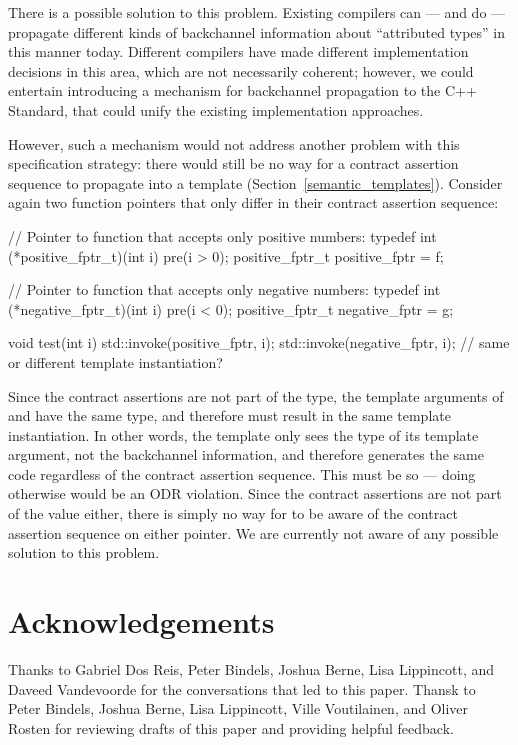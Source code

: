 There is a possible solution to this problem. Existing compilers can --- and do --- propagate different kinds of backchannel information about ``attributed types'' in this manner today. Different compilers have made different implementation decisions in this area, which are not necessarily coherent; however, we could entertain introducing a mechanism for backchannel propagation to the C++ Standard, that could unify the existing implementation approaches.

However, such a mechanism would not address another problem with this specification strategy: there would still be no way for a contract assertion sequence to propagate into a template (Section~\ref{semantic_templates}). Consider again two function pointers that only differ in their contract assertion sequence:
\begin{codeblock}
// Pointer to function that accepts only positive numbers:
typedef int (*positive_fptr_t)(int i) pre(i > 0);
positive_fptr_t positive_fptr = f;

// Pointer to function that accepts only negative numbers:
typedef int (*negative_fptr_t)(int i) pre(i < 0);
positive_fptr_t negative_fptr = g;

void test(int i) {
  std::invoke(positive_fptr, i);
  std::invoke(negative_fptr, i);  // same or different template instantiation?
}
\end{codeblock}
Since the contract assertions are not part of the type, the template arguments of  and  have the same type, and therefore must result in the same template instantiation. In other words, the template only sees the type of its template argument, not the backchannel information, and therefore generates the same code regardless of the contract assertion sequence. This must be so --- doing otherwise would be an ODR violation. Since the contract assertions are not part of the value either, there is simply no way for  to be aware of the contract assertion sequence on either pointer. We are currently not aware of any possible solution to this problem.


\section*{Acknowledgements}

Thanks to Gabriel Dos Reis, Peter Bindels, Joshua Berne, Lisa Lippincott, and Daveed Vandevoorde for the conversations that led to this paper. Thansk to Peter Bindels, Joshua Berne, Lisa Lippincott, Ville Voutilainen, and Oliver Rosten for reviewing drafts of this paper and providing helpful feedback.


\renewcommand{\addcontentsline}[3]{}%








